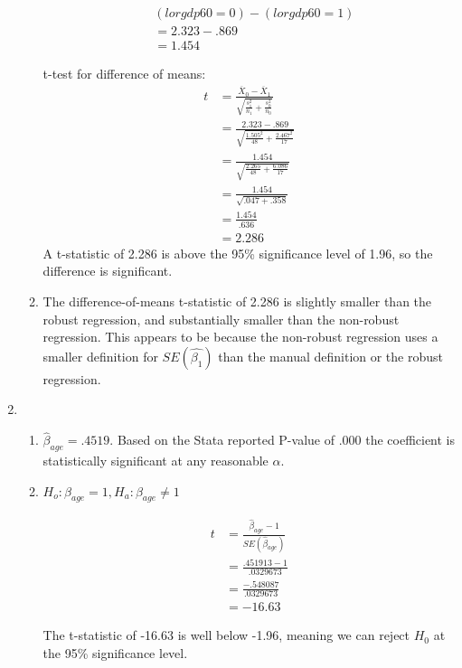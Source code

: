 \documentclass[12pt]{chmullighw}
\begin{document}
\begin{enumerate}
\begin{enumerate}
		\begin{align*}
			& (lorgdp60=0) - (lorgdp60=1) \\
			& = 2.323 - .869 \\
			& = 1.454
		\end{align*}
	
		t-test for difference of means:
		\begin{align*}
		t &= \frac{\overline{X}_0 - \overline{X}_1}{\sqrt{\frac{s_1^2}{n_1} + \frac{s_0^2}{n_0}}} \\
		&= \frac{2.323 - .869}{\sqrt{\frac{1.505^2}{48} + \frac{2.467^2}{17}}} \\
		&= \frac{1.454}{\sqrt{\frac{2.265}{48} + \frac{6.086}{17}}} \\
		&= \frac{1.454}{\sqrt{.047 + .358}} \\
		&= \frac{1.454}{.636} \\
		&= 2.286
		\end{align*}
		A t-statistic of 2.286 is above the 95\% significance level of 1.96, so the difference is significant. 
	\item The difference-of-means t-statistic of 2.286 is slightly smaller than the robust regression, and substantially smaller than the non-robust regression. This appears to be because the non-robust regression uses a smaller definition for $SE(\hat{\beta_1})$ than the manual definition or the robust regression.
	
	\end{enumerate} %
	
\newpage
\item
	\begin{enumerate}
	\item $\widehat{\beta}_{age} = .4519$. Based on the Stata reported P-value of .000 the coefficient is statistically significant at any reasonable $\alpha$.
	
	\item $H_o: \beta_{age} = 1, H_a: \beta_{age} \neq 1$
	
	\begin{align*}
	t &= \frac{\widehat{\beta}_{age} - 1}{SE(\widehat{\beta}_{age})} \\
	&= \frac{.451913 - 1}{.0329673} \\
	&= \frac{-.548087}{.0329673} \\
	&= -16.63
	\end{align*}
	
	The t-statistic of -16.63 is well below -1.96, meaning we can reject $H_0$ at the 95\% significance level.
	

\end{enumerate}
\end{enumerate}
\end{document}
